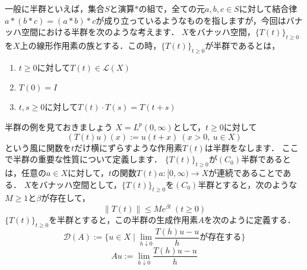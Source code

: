一般に半群といえば，集合$S$と演算$*$の組で，全ての元$a,b,c\in S$に対して結合律$a*(b*c)=(a*b)*c$が成り立っているようなものを指しますが，今回はバナッハ空間における半群を次のような考えます．
$X$をバナッハ空間，$\{ T(t) \}_{t\ge 0}$を$X$上の線形作用素の族とする．この時，$\{ T(t) \}_{t\ge 0}$が半群であるとは，
\begin{enumerate}
\renewcommand{\labelenumi}{(\theenumi)}
\item $t\ge 0$に対して$T(t) \in \mathcal{L}(X) $
\item $T(0) = I$
\item $t,s\ge 0$に対して$T(t) \cdot T(s) = T(t+s)$
\end{enumerate}
半群の例を見ておきましょう
\ex
$X=L^p(0,\infty )$として，$t\ge 0$に対して
\[ (T(t)u)(x) := u(t+x) \ (x>0 ,\ u\in X) \]
という風に関数を$t$だけ横にずらすような作用素$T(t)$は半群をなします．
\exx
ここで半群の重要な性質について定義します．
$\{T(t)\}_{t\ge 0}$が$(C_0)$半群であるとは，任意の$a\in X$に対して，$t$の関数$T(t)a:[0,\infty) \to X$が連続であることである．
\thm $X$をバナッハ空間として，$\{T(t)\}_{t\ge 0}$を$(C_0)$半群とすると，次のような$M \ge 1$と$\beta$が存在して，
\[ \| T(t) \| \le M e^{\beta t} \ (t\ge 0) \]
\thmx
{}
$\{T(t)\}_{t\ge 0}$を半群とすると，この半群の生成作用素$A$を次のように定義する．
\[
\mathcal {D}(A) := \{ u \in X \mid \lim_{h\downarrow 0} \frac{T(h)u-u}{h}が存在する \}
\]
\[
Au :=  \lim_{h\downarrow 0} \frac{T(h)u-u}{h}
\]

